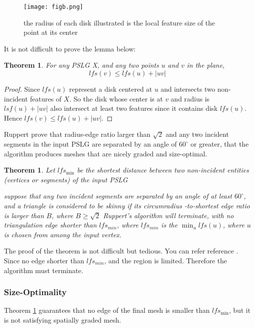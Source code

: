 \documentclass[letterpaper,12pt]{article}
\newtheorem{theorem}[lemma]{Theorem}
\begin{document}
\begin{figure}[!htb]
  \centering
  \texttt{[image: figb.png]}
  \caption{the radius of each disk illustrated is the local feature size of the point at its center}
  \label{fig:b}
\end{figure}

It is not difficult to prove the lemma below:
\begin{theorem}
  For any PSLG X, and any two points $u$ and $v$ in the plane, 
  \begin{equation*}
    lfs(v) \leq lfs(u) +|uv|
  \end{equation*}
\end{theorem}
\begin{proof}
  Since $lfs(u)$ represent a disk centered at $u$ and intersects two non-incident features of
  $X$. So the disk whose center is at $v$ and radius is $lsf(u) + |uv|$ also intersect at least two
  features since it contains disk $lfs(u)$. Hence $    lfs(v) \leq lfs(u) +|uv|$. 
\end{proof}

Ruppert prove that  radius-edge ratio larger than $\sqrt{2}$ and any two incident segments in the
input PSLG are separated by an angle of $60^{\circ}$ or greater, that the algorithm produces meshes
that are nicely graded and size-optimal. 

\begin{theorem}
\label{thm terminate}
  Let $lfs_{\min}$ be the shortest distance between two non-incident entities (vertices or segments)
  of the input PSLG

  suppose that any two incident segments are separated by an angle of at least $60^{\circ}$, and a
  triangle is considered to be skinny if its circumradius -to-shortest  edge ratio is larger than
  $B$, where $B \geq \sqrt{2}$ Ruppert's algorithm will terminate, with no triangulation edge
  shorter than $lfs_{min}$, where $lfs_{min}$ is the $\min_{u} {lfs(u)}$, where $u$ is chosen from
  among the input vertex. 
\end{theorem}
The proof of the theorem is not difficult but tedious.  You can refer reference
\cite{Richard}. Since no edge shorter than $lfs_{min}$, and the region is limited. Therefore the
algorithm must terminate. 

\subsubsection{Size-Optimality}
\label{sec:01:03:03}
Theorem \ref{thm terminate} guarantees that no edge of the final mesh is smaller than $lfs_{\min}$,
but it is not satisfying spatially graded mesh. 
\end{document}
